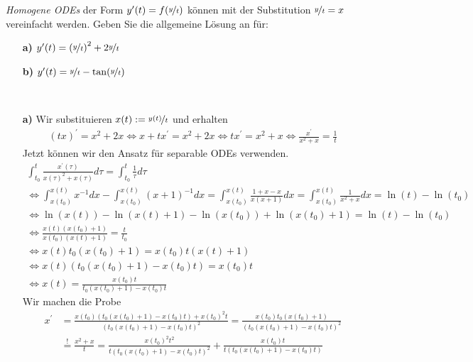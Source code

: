 \begin{exercise}
\textit{Homogene ODEs} der Form $y^{\prime}(t) = f(\nicefrac{y}{t})$
können mit der Substitution $\nicefrac{y}{t} = x$ vereinfacht werden.
Geben Sie die allgemeine Lösung an für:
\begin{itemize}
  \item [\textbf{a)}] $y^{\prime}(t) = \left(\nicefrac{y}{t}\right)^2
  + 2\nicefrac{y}{t}$
  \item [\textbf{b)}] $y^{\prime}(t) = \nicefrac{y}{t} - \tan(\nicefrac{y}{t})$
\end{itemize}
\end{exercise}
\begin{solution}
\leavevmode \\
\begin{itemize}
  \item [\textbf{a)}] Wir substituieren $x(t) := \nicefrac{y(t)}{t}$ und erhalten
  \begin{align*}
    (tx)^{\prime} = x^2 + 2x \iff x + tx^\prime = x^2 + 2x \iff t x^\prime = x^2 + x \iff \frac{x^{\prime}}{x^2 + x} = \frac{1}{t}
  \end{align*}
  Jetzt können wir den Ansatz für separable ODEs verwenden.
  \begin{gather*}
    \int_{t_0}^t \frac{x^{\prime}(\tau)}{x(\tau)^2 + x(\tau)}d\tau = \int_{t_0}^t \frac{1}{\tau}d\tau \\
    \iff \int_{x(t_0)}^{x(t)} x^{-1} dx - \int_{x(t_0)}^{x(t)} (x + 1)^{-1} dx = \int_{x(t_0)}^{x(t)} \frac{1 + x - x}{x(x + 1)} dx = \int_{x(t_0)}^{x(t)} \frac{1}{x^2 + x}dx = \ln(t) - \ln(t_0)\\
    \iff \ln(x(t)) - \ln(x(t) + 1) - \ln(x(t_0)) + \ln(x(t_0) + 1) = \ln(t) - \ln(t_0)\\
    \iff \frac{x(t)(x(t_0) + 1)}{x(t_0)(x(t) + 1)} = \frac{t}{t_0} \\
    \iff x(t)t_0(x(t_0) + 1) = x(t_0)t(x(t) + 1) \\
    \iff x(t)(t_0(x(t_0) + 1) - x(t_0)t) = x(t_0)t \\
    \iff x(t) = \frac{x(t_0)t}{t_0(x(t_0) + 1) - x(t_0)t}
  \end{gather*}
  Wir machen die Probe
  \begin{align*}
    x^{\prime} &= \frac{x(t_0)(t_0(x(t_0) + 1) - x(t_0)t) + x(t_0)^2t}{(t_0(x(t_0) + 1) - x(t_0)t)^2}
    = \frac{x(t_0)t_0(x(t_0) + 1)}{(t_0(x(t_0) + 1) - x(t_0)t)^2}\\
    &\stackrel{!}{=} \frac{x^2 + x}{t}
    = \frac{x(t_0)^2t^2}{t(t_0(x(t_0) + 1) - x(t_0)t)^2} + \frac{x(t_0)t}{t(t_0(x(t_0) + 1) - x(t_0)t)} \\

\end{align*}
\end{itemize}
\end{solution}
